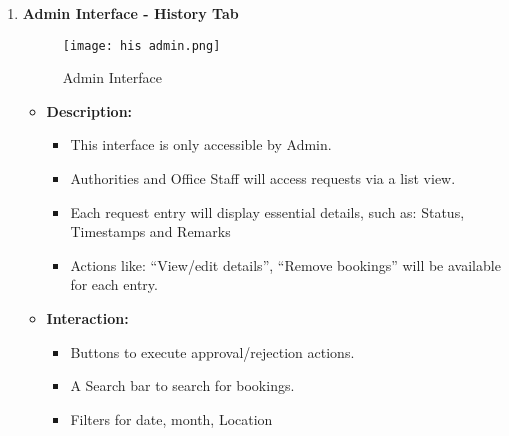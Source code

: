 \documentclass[a4paper,12pt]{article}
\begin{document}
\begin{enumerate} [label=\Roman*.]
    \begin{itemize}
        \item \textbf{Description:}
        \begin{itemize}
            \item After filling the form, the user can either:
            \begin{itemize} 
                \item Select a particular Lecture Hall, or
                \item Let the system select it automatically.
            \end{itemize}
            \item Real-time validation to ensure form completeness.
        \end{itemize}
        \item \textbf{Interaction:}
        \begin{itemize} 
            \item Text fields for: “Purpose”, “Capacity”
            \item Input fields for: “Date”, “Lecture Hall”, “Accessories”
            \item "Submit" button for finalizing the request.
            \item Interactive form fields with tooltips for assistance.
        \end{itemize}
    \end{itemize}
    \newpage
    \item \textbf{Admin Interface - History Tab}
    \begin{figure}[h!]
    \centering
    \texttt{[image: his admin.png]} 
    \caption{Admin Interface}
    \label{Fig 3.1.1 : Login Screen}
\end{figure}
    
    \begin{itemize} 
        \item \textbf{Description:}
        \begin{itemize} 
            \item This interface is only accessible by Admin.
            \item Authorities and Office Staff will access requests via a list view.
            \item Each request entry will display essential details, such as: Status, Timestamps and Remarks
            \item Actions like: “View/edit details”, “Remove bookings” will be available for each entry.
        \end{itemize}
        \item \textbf{Interaction:}
        \begin{itemize} 
            \item Buttons to execute approval/rejection actions. 
            \item A Search bar to search for bookings.
            \item Filters for date, month, Location
        \end{itemize}
    \end{itemize}
\end{enumerate}
\end{document}
